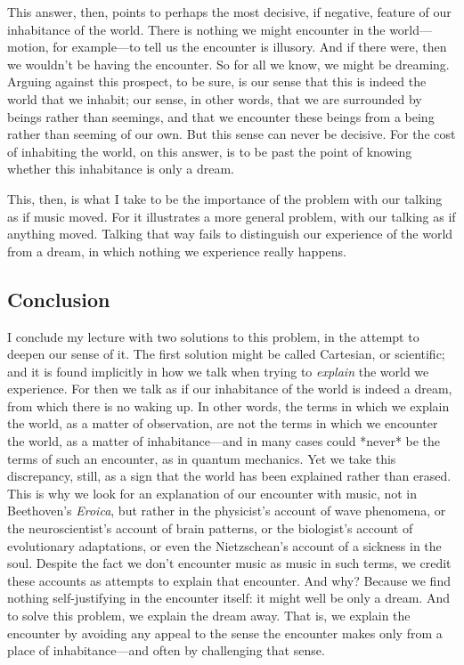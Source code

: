 \documentclass[12pt]{memoir}
\begin{document}
This answer, then, points to perhaps the most
decisive, if negative, feature of our inhabitance
of the world. There is nothing we might encounter
in the world---motion, for example---to tell us
the encounter is illusory. And if there were, then
we wouldn't be having the encounter. So for all
we know, we might be dreaming. Arguing against
this prospect, to be sure, is our sense that this
is indeed the world that we inhabit; our sense,
in other words, that we are surrounded by beings
rather than seemings, and that we encounter these
beings from a being rather than seeming of our
own. But this sense can never be decisive. For
the cost of inhabiting the world, on this answer,
is to be past the point of knowing whether this
inhabitance is only a dream.

This, then, is what I take to be the importance of
the problem with our talking as if music moved.
For it illustrates a more general problem, with
our talking as if anything moved. Talking that
way fails to distinguish our experience of the
world from a dream, in which nothing we experience
really happens.

\subsection{Conclusion}

I conclude my lecture with two solutions to this
problem, in the attempt to deepen our sense of
it. The first solution might be called Cartesian,
or scientific; and it is found implicitly in
how we talk when trying to \emph{explain} the
world we experience. For then we talk as if our
inhabitance of the world is indeed a dream, from
which there is no waking up. In other words,
the terms in which we explain the world, as a
matter of observation, are not the terms in
which we encounter the world, as a matter of
inhabitance---and in many cases could *never* be
the terms of such an encounter, as in quantum
mechanics. Yet we take this discrepancy, still,
as a sign that the world has been explained
rather than erased. This is why we look for an
explanation of our encounter with music, not in
Beethoven's \emph{Eroica}, but rather in the
physicist's account of wave phenomena, or the
neuroscientist's account of brain patterns, or the
biologist's account of evolutionary adaptations,
or even the Nietzschean's account of a sickness
in the soul. Despite the fact we don't encounter
music as music in such terms, we credit these
accounts as attempts to explain that encounter.
And why? Because we find nothing self-justifying
in the encounter itself: it might well be only a
dream. And to solve this problem, we explain the
dream away. That is, we explain the encounter by
avoiding any appeal to the sense the encounter
makes only from a place of inhabitance---and often
by challenging that sense.
\end{document}
